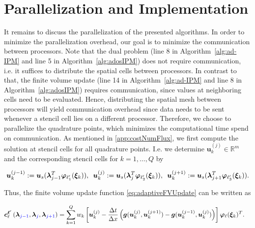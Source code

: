 \section{Parallelization and Implementation}
\label{sec:parallel}
It remains to discuss the parallelization of the presented algorithms. In order to minimize the parallelization overhead, our goal is to minimize the communication between processors. Note that the dual problem (line 8 in Algorithm~\ref{alg:ad-IPM} and line 5 in Algorithm~\ref{alg:adosIPM}) does not require communication, i.e. it suffices to distribute the spatial cells between processors. In contrast to that, the finite volume update (line 14 in Algorithm~\ref{alg:ad-IPM} and line 8 in Algorithm~\ref{alg:adosIPM}) requires communication, since values at neighboring cells need to be evaluated. Hence, distributing the spatial mesh between processors will yield communication overhead since data needs to be sent whenever a stencil cell lies on a different processor. Therefore, we choose to parallelize the quadrature points, which minimizes the computational time spend on communication. As mentioned in \ref{app:costNumFlux}, we first compute the solution at stencil cells for all quadrature points. I.e. we determine $\bm u^{(j)}_k\in\mathbb{R}^m$ and the corresponding stencil cells for $k = 1,\dots,Q$ by
\begin{linenomath*}\begin{align*}
\bm u^{(j-1)}_k := \bm u_{s}(\bm{\lambda}_{j-1}^T\bm{\varphi}_{\ell_1'}(\bm \xi_k)), \enskip \bm u^{(j)}_k := \bm u_{s}(\bm{\lambda}_{j}^T\bm{\varphi}_{\ell_2'}(\bm \xi_k)), \enskip \bm u^{(j+1)}_k := \bm u_{s}(\bm{\lambda}_{j+1}^T\bm{\varphi}_{\ell_3'}(\bm \xi_k)).
\end{align*}\end{linenomath*}
Thus, the finite volume update function \eqref{eq:adaptiveFVUpdate} can be written as
\begin{linenomath*}\begin{align}\label{eq:momentUpQuadrature}
\bm{c}_{\ell}^{\bm{\ell}'}&\left(\bm{\lambda}_{{\textcolor{blue}{j-1}}},\bm{\lambda}_{{\textcolor{blue}{j}}},\bm{\lambda}_{{\textcolor{blue}{j+1}}}\right)=\sum_{k=1}^Q w_k \left[\bm u^{(j)}_k- \frac{\Delta t}{\Delta x}\left(\bm g( \bm u^{(j)}_k,\bm u^{(j+1)}_k )- \bm g( \bm u^{(j-1)}_k,\bm u^{(j)}_k )\right)\right]\bm{\varphi}_{\ell}(\bm \xi_k)^T.
\end{align}\end{linenomath*}
